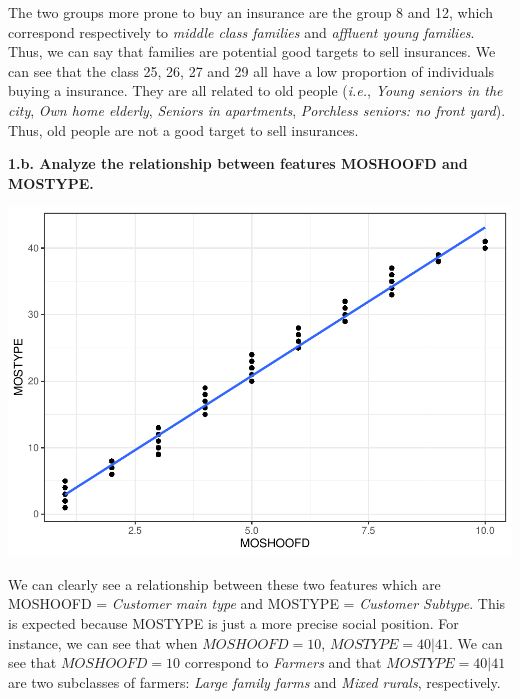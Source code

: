\documentclass[
  12pt,
  oneside]{report}
\newenvironment{Shaded}{\begin{snugshade}}{\end{snugshade}}
\newcommand{\DataTypeTok}[1]{\textcolor[rgb]{0.13,0.29,0.53}{#1}}
\newcommand{\KeywordTok}[1]{\textcolor[rgb]{0.13,0.29,0.53}{\textbf{#1}}}
\newcommand{\NormalTok}[1]{#1}
\newcommand{\OperatorTok}[1]{\textcolor[rgb]{0.81,0.36,0.00}{\textbf{#1}}}
\newcommand{\StringTok}[1]{\textcolor[rgb]{0.31,0.60,0.02}{#1}}
\begin{document}
The two groups more prone to buy an insurance are the group 8 and 12, which correspond respectively to \emph{middle class families} and \emph{affluent young families}. Thus, we can say that families are potential good targets to sell insurances. We can see that the class 25, 26, 27 and 29 all have a low proportion of individuals buying a insurance. They are all related to old people (\emph{i.e.}, \emph{Young seniors in the city}, \emph{Own home elderly}, \emph{Seniors in apartments}, \emph{Porchless seniors: no front yard}). Thus, old people are not a good target to sell insurances.

\textbf{1.b. Analyze the relationship between features MOSHOOFD and MOSTYPE.}

\begin{Shaded}
\end{Shaded}

\includegraphics{leroy_francois_hw2_files/figure-latex/unnamed-chunk-9-1.pdf}

We can clearly see a relationship between these two features which are MOSHOOFD = \emph{Customer main type} and MOSTYPE = \emph{Customer Subtype}. This is expected because MOSTYPE is just a more precise social position. For instance, we can see that when \(MOSHOOFD = 10\), \(MOSTYPE = 40 | 41\). We can see that \(MOSHOOFD = 10\) correspond to \emph{Farmers} and that \(MOSTYPE = 40 | 41\) are two subclasses of farmers: \emph{Large family farms} and \emph{Mixed rurals}, respectively.
\end{document}

